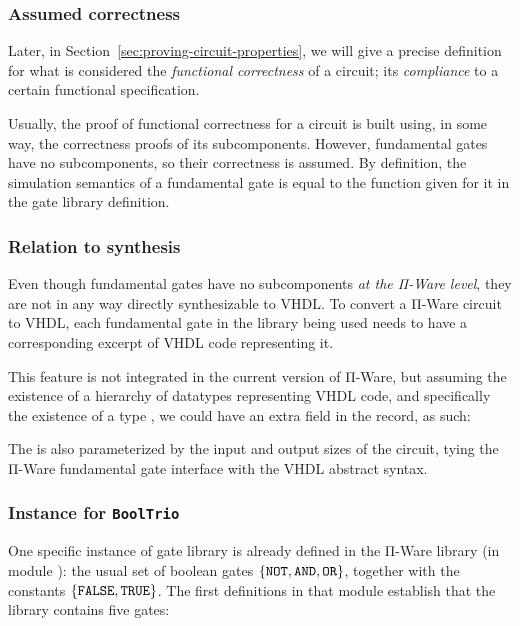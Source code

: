             \subsubsection{Assumed correctness}
            Later, in Section~\ref{sec:proving-circuit-properties}, we will give a precise definition
            for what is considered the \emph{functional correctness} of a circuit; its \emph{compliance}
            to a certain functional specification.

            Usually, the proof of functional correctness for a circuit is built using, in some way,
            the correctness proofs of its subcomponents.
            However, fundamental gates have no subcomponents, so their correctness is assumed.
            By definition, the simulation semantics of a fundamental gate is equal to the 
            function given for it in the gate library definition.

            \subsubsection{Relation to synthesis}
            \label{subsubsec:relation-to-synthesis}
            Even though fundamental gates have no subcomponents \emph{at the Π-Ware level},
            they are not in any way directly synthesizable to \ac{VHDL}.
            To convert a Π-Ware circuit to \ac{VHDL}, each fundamental gate in the library being used
            needs to have a corresponding excerpt of \ac{VHDL} code representing it.

            This feature is not integrated in the current version of Π-Ware, but assuming the existence
            of a hierarchy of datatypes representing \ac{VHDL} code, and specifically the existence
            of a type , we could have an extra field in the  record, as such:

            \begin{center}
                \AY{:} \AY{(} \AY{:}  \AY{(} \AY{)}\AY{)}   \AY{(} \AY{)} \AY{(} \AY{)}
            \end{center}

            The  is also parameterized by the input and output sizes of the circuit,
            tying the Π-Ware fundamental gate interface with the \ac{VHDL} abstract syntax.

            \subsubsection{Instance for \texttt{BoolTrio}}
            One specific instance of gate library is already defined in the Π-Ware library
            (in module ): the usual set of boolean gates
            $\{ \text{\texttt{NOT}}, \text{\texttt{AND}}, \text{\texttt{OR}} \}$,
            together with the constants $\{ \text{\texttt{FALSE}}, \text{\texttt{TRUE}} \}$.
            The first definitions in that module establish that the library contains five gates:


